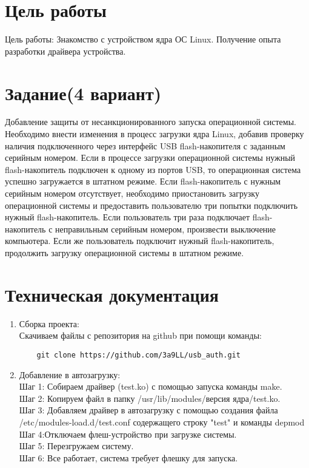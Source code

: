 \documentclass[a4paper]{article}
\begin{document}
\newpage

\section{Цель работы}

\normalsize Цель работы: Знакомство с устройством ядра ОС Linux. Получение опыта разработки драйвера устройства.

\section{Задание(4 вариант)}

Добавление защиты от несанкционированного запуска операционной системы.
Необходимо внести изменения в процесс загрузки ядра Linux, добавив проверку наличия
подключенного через интерфейс USB flash-накопителя с заданным серийным номером.
Если в процессе загрузки операционной системы нужный flash-накопитель подключен к
одному из портов USB, то операционная система успешно загружается в штатном режиме.
Если flash-накопитель с нужным серийным номером отсутствует, необходимо
приостановить загрузку операционной системы и предоставить пользователю три попытки
подключить нужный flash-накопитель. Если пользователь три раза подключает flash-
накопитель с неправильным серийным номером, произвести выключение компьютера.
Если же пользователь подключит нужный flash-накопитель, продолжить загрузку
операционной системы в штатном режиме.

\section{Техническая документация}
\begin{enumerate}
	\item Сборка проекта: \\
		Скачиваем файлы с репозитория на github при помощи команды: \begin{verbatim}
	git clone https://github.com/3a9LL/usb_auth.git
\end{verbatim} 
	\item Добавление в автозагрузку: \\
	Шаг 1: Собираем драйвер (test.ko) с помощью запуска команды make.
	 \\
	Шаг 2: Копируем файл в папку /usr/lib/modules/версия ядра/test.ko.
	  \\
	Шаг 3: Добавляем драйвер в автозагрузку с помощью создания файла /etc/modules-load.d/test.conf содержащего строку "test" и команды depmod
	  \\
	Шаг 4:Отключаем флеш-устройство при загрузке системы.
	 \\
	Шаг 5: Перезгружаем систему.
	  \\
	Шаг 6:	Все работает, система требует флешку для запуска.
\end{enumerate}
\newpage
\end{document}
